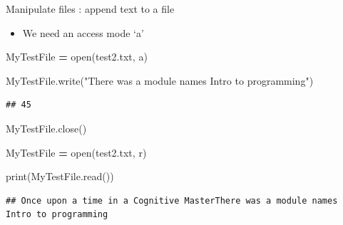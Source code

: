 \documentclass[
  8pt,
  ignorenonframetext,
]{beamer}
\newenvironment{Shaded}{\begin{snugshade}}{\end{snugshade}}
\newcommand{\BuiltInTok}[1]{#1}
\newcommand{\NormalTok}[1]{#1}
\newcommand{\OperatorTok}[1]{\textcolor[rgb]{0.81,0.36,0.00}{\textbf{#1}}}
\newcommand{\StringTok}[1]{\textcolor[rgb]{0.31,0.60,0.02}{#1}}
\providecommand{\tightlist}{%
  \setlength{\itemsep}{0pt}\setlength{\parskip}{0pt}}
\begin{document}
\begin{frame}[fragile]{Manipulate files : append text to a file}
\protect\hypertarget{manipulate-files-append-text-to-a-file}{}
\begin{itemize}
\tightlist
\item
  We need an access mode `a'
\end{itemize}

\begin{Shaded}
\begin{Highlighting}[]
\NormalTok{MyTestFile }\OperatorTok{=} \BuiltInTok{open}\NormalTok{(}\StringTok{\textquotesingle{}test2.txt\textquotesingle{}}\NormalTok{, }\StringTok{\textquotesingle{}a\textquotesingle{}}\NormalTok{)}

\NormalTok{MyTestFile.write(}\StringTok{"There was a module names Intro to programming"}\NormalTok{)}
\end{Highlighting}
\end{Shaded}

\begin{verbatim}
## 45
\end{verbatim}

\begin{Shaded}
\begin{Highlighting}[]
\NormalTok{MyTestFile.close()}

\NormalTok{MyTestFile }\OperatorTok{=} \BuiltInTok{open}\NormalTok{(}\StringTok{\textquotesingle{}test2.txt\textquotesingle{}}\NormalTok{, }\StringTok{\textquotesingle{}r\textquotesingle{}}\NormalTok{)}

\BuiltInTok{print}\NormalTok{(MyTestFile.read())}
\end{Highlighting}
\end{Shaded}

\begin{verbatim}
## Once upon a time in a Cognitive MasterThere was a module names Intro to programming
\end{verbatim}
\end{frame}
\end{document}
